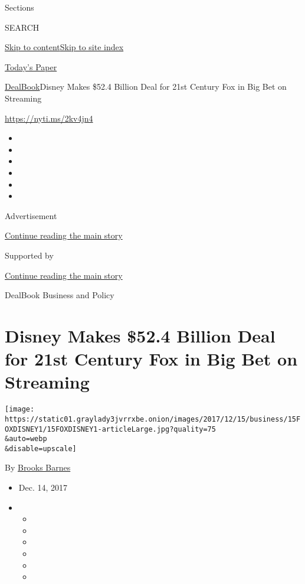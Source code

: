 Sections

SEARCH

\protect\hyperlink{site-content}{Skip to
content}\protect\hyperlink{site-index}{Skip to site index}

\href{https://myaccount.nytimes3xbfgragh.onion/auth/login?response_type=cookie\&client_id=vi}{}

\href{https://www.nytimes3xbfgragh.onion/section/todayspaper}{Today's
Paper}

\href{/section/business/dealbook}{DealBook}\textbar{}Disney Makes \$52.4
Billion Deal for 21st Century Fox in Big Bet on Streaming

\url{https://nyti.ms/2kv4jn4}

\begin{itemize}
\item
\item
\item
\item
\item
\item
\end{itemize}

Advertisement

\protect\hyperlink{after-top}{Continue reading the main story}

Supported by

\protect\hyperlink{after-sponsor}{Continue reading the main story}

DealBook Business and Policy

\hypertarget{disney-makes-524-billion-deal-for-21st-century-fox-in-big-bet-on-streaming}{%
\section{Disney Makes \$52.4 Billion Deal for 21st Century Fox in Big
Bet on
Streaming}\label{disney-makes-524-billion-deal-for-21st-century-fox-in-big-bet-on-streaming}}

\texttt{[image: https://static01.graylady3jvrrxbe.onion/images/2017/12/15/business/15FOXDISNEY1/15FOXDISNEY1-articleLarge.jpg?quality=75\\\&auto=webp\\\&disable=upscale]}

By \href{http://www.nytimes3xbfgragh.onion/by/brooks-barnes}{Brooks
Barnes}

\begin{itemize}
\item
  Dec. 14, 2017
\item
  \begin{itemize}
  \item
  \item
  \item
  \item
  \item
  \item
  \end{itemize}
\end{itemize}

